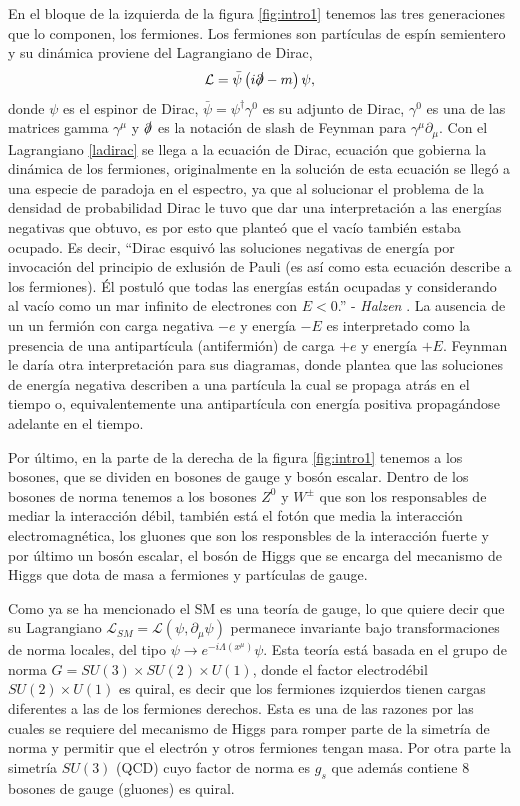 En el bloque de la izquierda de la figura \ref{fig:intro1} tenemos las tres generaciones que lo componen, los fermiones. Los fermiones son partículas de espín semientero y su dinámica proviene del Lagrangiano de Dirac,
\begin{equation}
    \mathcal{L} = \bar{\psi}\left(i\slashed \partial - m\right)\psi, \label{ladirac}
\end{equation}
donde \(\psi\) es el espinor de Dirac, \(\bar{\psi}=\psi^\dagger\gamma^0\) es su adjunto de Dirac, \(\gamma^0\) es una de las matrices gamma \(\gamma^\mu\) y \(\slashed\partial\) es la notación de slash de Feynman para \(\gamma^\mu\partial_{\mu}\). Con el Lagrangiano \ref{ladirac} se llega a la ecuación de Dirac, ecuación que gobierna la dinámica de los fermiones, originalmente en la solución de esta ecuación se llegó a una especie de paradoja en el espectro, ya que al solucionar el problema de la densidad de probabilidad Dirac le tuvo que dar una interpretación a las energías negativas que obtuvo, es por esto que planteó que el vacío también estaba ocupado. Es decir, ``Dirac esquivó las soluciones negativas de energía por invocación del principio de exlusión de Pauli (es así como esta ecuación describe a los fermiones). Él postuló que todas las energías están ocupadas y considerando al vacío como un mar infinito de electrones con \(E<0\).'' - \textit{Halzen} \cite{Halzen:1984mc}. La ausencia de un un fermión con carga negativa \(-e\) y energía \(-E\) es interpretado como la presencia de una antipartícula (antifermión) de carga \(+e\) y energía \(+E\). Feynman le daría otra interpretación para sus diagramas, donde plantea que las soluciones de energía negativa describen a una partícula la cual se propaga atrás en el tiempo o, equivalentemente una antipartícula con energía positiva propagándose adelante en el tiempo.

Por último, en la parte de la derecha de la figura \ref{fig:intro1} tenemos a los bosones, que se dividen en bosones de gauge y bosón escalar. Dentro de los bosones de norma tenemos a los bosones \(Z^0\) y \(W^{\pm}\) que son los responsables de mediar la interacción débil, también está el fotón que media la interacción electromagnética, los gluones que son los responsbles de la interacción fuerte y por último un bosón escalar, el bosón de Higgs que se encarga del mecanismo de Higgs que dota de masa a fermiones y partículas de gauge.

Como ya se ha mencionado el SM es una teoría de gauge, lo que quiere decir que su Lagrangiano \(\mathcal{L}_{SM}=\mathcal{L}(\psi,\partial_{\mu}\psi)\) permanece invariante bajo transformaciones de norma locales, del tipo \(\psi\rightarrow e^{-i\Lambda(x^\mu)}\psi\). Esta teoría está basada en el grupo de norma \(G=SU(3)\times SU(2)\times U(1)\), donde el factor electrodébil \(SU(2)\times U(1)\) es quiral, es decir que los fermiones izquierdos tienen cargas diferentes a las de los fermiones derechos. Esta es una de las razones por las cuales se requiere del mecanismo de Higgs para romper parte de la simetría de norma y permitir que el electrón y otros fermiones tengan masa. Por otra parte la simetría \(SU(3)\) (QCD) cuyo factor de norma es \(g_{s}\) que además contiene 8 bosones de gauge (gluones) es quiral. 

